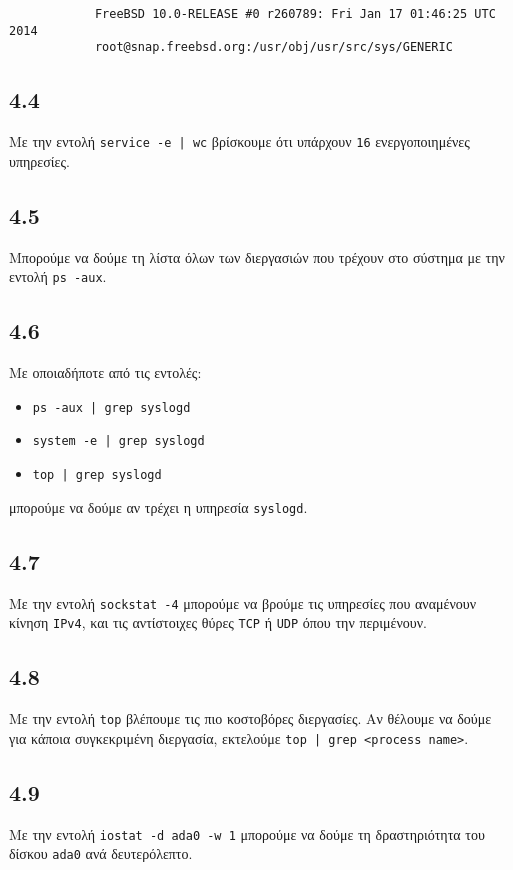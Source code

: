 \documentclass[a4paper, 12pt]{article}
\begin{document}
		\begin{verbatim}
			FreeBSD 10.0-RELEASE #0 r260789: Fri Jan 17 01:46:25 UTC 2014     
			root@snap.freebsd.org:/usr/obj/usr/src/sys/GENERIC 
		\end{verbatim}

	\subsection*{4.4}
		 Με την εντολή \verb+service -e | wc+ βρίσκουμε ότι υπάρχουν \verb|16| ενεργοποιημένες υπηρεσίες.

	\subsection*{4.5}
		 Μπορούμε να δούμε τη λίστα όλων των διεργασιών που τρέχουν στο σύστημα με την εντολή \verb|ps -aux|.

	\subsection*{4.6}
		 Με οποιαδήποτε από τις εντολές:
		 
		 \begin{itemize}
		 	\item \verb+ps -aux | grep syslogd+
		 	\item \verb+system -e | grep syslogd+
		 	\item \verb+top | grep syslogd+ 
		 \end{itemize}
		 μπορούμε να δούμε αν τρέχει η υπηρεσία \verb|syslogd|. 

	\subsection*{4.7}
		Με την εντολή \verb|sockstat -4| μπορούμε να βρούμε τις υπηρεσίες που αναμένουν κίνηση \verb|IPv4|, και τις αντίστοιχες θύρες \verb|TCP| ή \verb|UDP| όπου την περιμένουν.

	\subsection*{4.8}
		Με την εντολή \verb|top| βλέπουμε τις πιο κοστοβόρες διεργασίες. Αν θέλουμε να δούμε για κάποια συγκεκριμένη διεργασία, εκτελούμε \verb+top | grep <process name>+.

	\subsection*{4.9}
		Με την εντολή \verb|iostat -d ada0 -w 1| μπορούμε να δούμε τη δραστηριότητα του δίσκου \verb|ada0| ανά δευτερόλεπτο.
\end{document}
